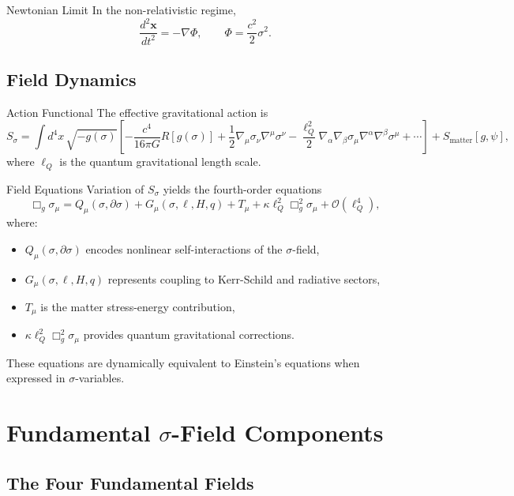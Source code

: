 \documentclass[11pt,a4paper]{article}
\theoremstyle{definition}
\theoremstyle{remark}
\begin{document}
	Newtonian Limit
		In the non-relativistic regime,
		\begin{equation}
			\frac{d^2\mathbf{x}}{dt^2} = -\nabla \Phi, \qquad \Phi = \frac{c^2}{2}\sigma^2.
		\end{equation}
	
	\subsection{Field Dynamics}
	
	Action Functional
		The effective gravitational action is
		\begin{equation}
			S_\sigma = \int d^4x \, \sqrt{-g(\sigma)} \left[
			-\frac{c^4}{16\pi G} R[g(\sigma)] + \frac{1}{2}\nabla_\mu \sigma_\nu \nabla^\mu \sigma^\nu - \frac{\ell_Q^2}{2} \nabla_\alpha\nabla_\beta\sigma_\mu \nabla^\alpha\nabla^\beta\sigma^\mu + \cdots
			\right] + S_{\text{matter}}[g,\psi],
		\end{equation}
		where $\ell_Q$ is the quantum gravitational length scale.
	
	Field Equations
		Variation of $S_\sigma$ yields the fourth-order equations
		\begin{equation}
			\boxed{\Box_g \sigma_\mu = Q_\mu(\sigma, \partial\sigma) + G_\mu(\sigma, \ell, H, q) + T_\mu + \kappa\ell_Q^2 \Box_g^2 \sigma_\mu + \mathcal{O}(\ell_Q^4),}
		\end{equation}
		where:
		\begin{itemize}
			\item $Q_\mu(\sigma, \partial\sigma)$ encodes nonlinear self-interactions of the $\sigma$-field,
			\item $G_\mu(\sigma, \ell, H, q)$ represents coupling to Kerr-Schild and radiative sectors,
			\item $T_\mu$ is the matter stress-energy contribution,
			\item $\kappa\ell_Q^2 \Box_g^2 \sigma_\mu$ provides quantum gravitational corrections.
		\end{itemize}
		These equations are dynamically equivalent to Einstein's equations when expressed in $\sigma$-variables.
	
	\section{Fundamental $\sigma$-Field Components}
	
	\subsection{The Four Fundamental Fields}
	
\end{document}
